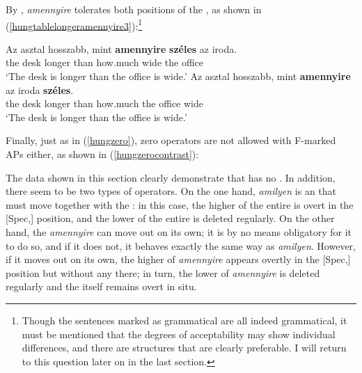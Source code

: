 By , \textit{amennyire} tolerates both positions of the , as shown in (\ref{hungtablelongeramennyire3}):\footnote{Though the sentences marked as grammatical are all indeed grammatical, it must be mentioned that the degrees of acceptability may show individual differences, and there are structures that are clearly preferable. I will return to this question later on in the last section.}

\ea \label{hungtablelongeramennyire3}
\ea	\gll Az asztal	hosszabb,	mint \textbf{amennyire} \textbf{széles}	az iroda.\\
the	desk longer	than how.much wide	the	office\\
\glt `The desk is longer than the office is wide.'
\ex	\gll Az	asztal hosszabb, mint	\textbf{amennyire} az iroda \textbf{széles}.\\
the	desk longer	than how.much the office	wide\\
\glt `The desk is longer than the office is wide.'
\z
\z

Finally, just as in (\ref{hungzero}), zero operators are not allowed with F-marked APs either, as shown in (\ref{hungzerocontrast}):

\ea \label{hungzerocontrast}
\z
\z

The data shown in this section clearly demonstrate that  has no . In addition, there seem to be two types of operators. On the one hand, \textit{amilyen} is an  that must move together with the : in this case, the higher  of the entire  is overt in the [Spec,] position, and the lower  of the entire  is deleted regularly. On the other hand, the  \textit{amennyire} can move out on its own; it is by no means obligatory for it to do so, and if it does not, it behaves exactly the same way as \textit{amilyen}. However, if it moves out on its own, the higher  of \textit{amennyire} appears overtly in the [Spec,] position but without any  there; in turn, the lower  of \textit{amennyire} is deleted regularly and the  itself remains overt in situ.

